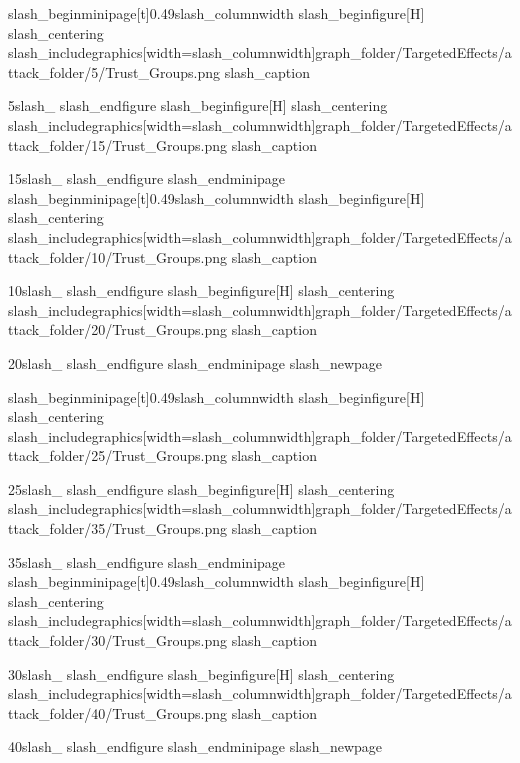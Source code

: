 slash_begin{minipage}[t]{0.49slash_columnwidth}
    slash_begin{figure}[H]
        slash_centering
        slash_includegraphics[width=slash_columnwidth]{graph_folder/TargetedEffects/attack_folder/5/Trust_Groups.png}
        slash_caption{5slash_%
    slash_end{figure}
    slash_begin{figure}[H]
        slash_centering
        slash_includegraphics[width=slash_columnwidth]{graph_folder/TargetedEffects/attack_folder/15/Trust_Groups.png}
        slash_caption{15slash_%
    slash_end{figure}
slash_end{minipage}
slash_begin{minipage}[t]{0.49slash_columnwidth}
    slash_begin{figure}[H]
        slash_centering
        slash_includegraphics[width=slash_columnwidth]{graph_folder/TargetedEffects/attack_folder/10/Trust_Groups.png}
        slash_caption{10slash_%
    slash_end{figure}
    slash_begin{figure}[H]
        slash_centering
        slash_includegraphics[width=slash_columnwidth]{graph_folder/TargetedEffects/attack_folder/20/Trust_Groups.png}
        slash_caption{20slash_%
    slash_end{figure}
slash_end{minipage}
slash_newpage

slash_begin{minipage}[t]{0.49slash_columnwidth}
    slash_begin{figure}[H]
        slash_centering
        slash_includegraphics[width=slash_columnwidth]{graph_folder/TargetedEffects/attack_folder/25/Trust_Groups.png}
        slash_caption{25slash_%
    slash_end{figure}
    slash_begin{figure}[H]
        slash_centering
        slash_includegraphics[width=slash_columnwidth]{graph_folder/TargetedEffects/attack_folder/35/Trust_Groups.png}
        slash_caption{35slash_%
    slash_end{figure}
slash_end{minipage}
slash_begin{minipage}[t]{0.49slash_columnwidth}
    slash_begin{figure}[H]
        slash_centering
        slash_includegraphics[width=slash_columnwidth]{graph_folder/TargetedEffects/attack_folder/30/Trust_Groups.png}
        slash_caption{30slash_%
    slash_end{figure}
    slash_begin{figure}[H]
        slash_centering
        slash_includegraphics[width=slash_columnwidth]{graph_folder/TargetedEffects/attack_folder/40/Trust_Groups.png}
        slash_caption{40slash_%
    slash_end{figure}
slash_end{minipage}
slash_newpage

}}}}}}}}
